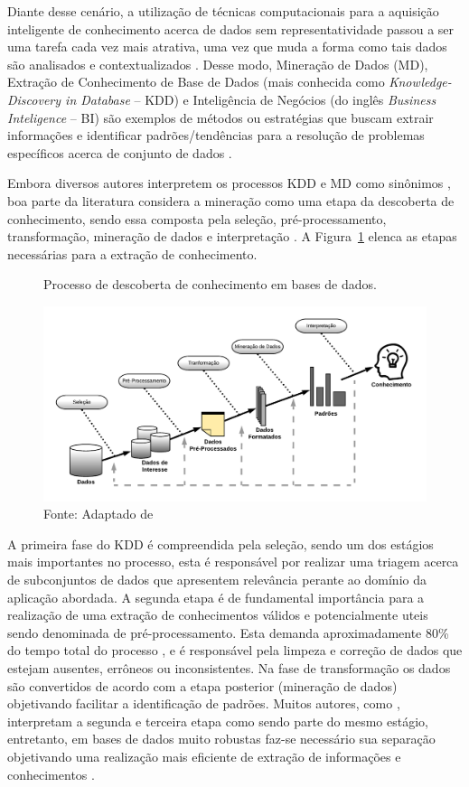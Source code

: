 Diante desse cenário, a utilização de técnicas computacionais para a aquisição inteligente de conhecimento acerca de dados sem representatividade passou a ser uma tarefa cada vez mais atrativa, uma vez que muda a forma como tais dados são analisados e contextualizados \cite{cap02_ref11}. Desse modo, Mineração de Dados (MD), Extração de Conhecimento de Base de Dados (mais conhecida como \textit{Knowledge-Discovery in Database} – KDD) e Inteligência de Negócios (do inglês \textit{Business Inteligence} – BI) são exemplos de métodos ou estratégias que buscam extrair informações e identificar padrões/tendências para a resolução de problemas específicos acerca de conjunto de dados \cite{cap02_ref12, cap02_ref4}. 

Embora diversos autores interpretem os processos KDD e MD como sinônimos \cite{cap02_ref11, cap02_ref6}, boa parte da literatura considera a mineração como uma etapa da descoberta de conhecimento, sendo essa composta pela seleção, pré-processamento, transformação, mineração de dados e interpretação \cite{cap02_ref12, cap02_ref5}. A Figura~\ref{fig:kdd_process} elenca as etapas necessárias para a extração de conhecimento.


\begin{figure}[htpb]
   \centering
   \caption{Processo de descoberta de conhecimento em bases de dados.}
   \includegraphics[width=\textwidth]{figs/cap02_KDD_model.pdf}
   \caption*{\footnotesize{Fonte: Adaptado de \cite{cap02_ref12}}}
   \label{fig:kdd_process}
\end{figure}

A primeira fase do KDD é compreendida pela seleção, sendo um dos estágios mais importantes no processo, esta é responsável por realizar uma triagem acerca de subconjuntos de dados que apresentem relevância perante ao domínio da aplicação abordada. A segunda etapa é de fundamental importância para a realização de uma extração de conhecimentos válidos e potencialmente uteis sendo denominada de pré-processamento. Esta demanda aproximadamente 80\% do tempo total do processo \cite{cap02_ref13}, e é responsável pela limpeza e correção de dados que estejam ausentes, errôneos ou inconsistentes. Na fase de transformação os dados são convertidos de acordo com a etapa posterior (mineração de dados) objetivando facilitar a identificação de padrões. Muitos autores, como \cite{cap02_ref11, cap02_ref6}, interpretam a segunda e terceira etapa como sendo parte do mesmo estágio, entretanto, em bases de dados muito robustas faz-se necessário sua separação objetivando uma realização mais eficiente de extração de informações e conhecimentos \cite{cap02_ref12}.

